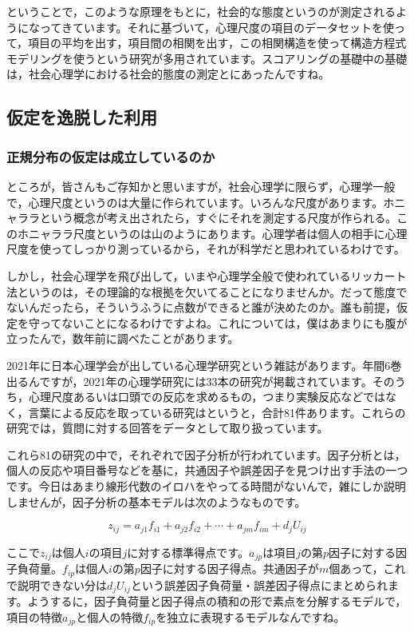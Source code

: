 \documentclass{ltjsbook}
\begin{document}
ということで，このような原理をもとに，社会的な態度というのが測定されるようになってきています。それに基づいて，心理尺度の項目のデータセットを使って，項目の平均を出す，項目間の相関を出す，この相関構造を使って構造方程式モデリングを使うという研究が多用されています。スコアリングの基礎中の基礎は，社会心理学における社会的態度の測定とにあったんですね。

\subsection{仮定を逸脱した利用}

\subsubsection{正規分布の仮定は成立しているのか}
ところが，皆さんもご存知かと思いますが，社会心理学に限らず，心理学一般で，心理尺度というのは大量に作られています。いろんな尺度があります。ホニャララという概念が考え出されたら，すぐにそれを測定する尺度が作られる。このホニャララ尺度というのは山のようにあります。心理学者は個人の相手に心理尺度を使ってしっかり測っているから，それが科学だと思われているわけです。

しかし，社会心理学を飛び出して，いまや心理学全般で使われているリッカート法というのは，その理論的な根拠を欠いてることになりませんか。だって態度でないんだったら，そういうふうに点数ができると誰が決めたのか。誰も前提，仮定を守ってないことになるわけですよね。これについては，僕はあまりにも腹が立ったんで，数年前に調べたことがあります。

2021年に日本心理学会が出している心理学研究という雑誌があります。年間6巻出るんですが，2021年の心理学研究には33本の研究が掲載されています。そのうち，心理尺度あるいは口頭での反応を求めるもの，つまり実験反応などではなく，言葉による反応を取っている研究はというと，合計81件あります。これらの研究では，質問に対する回答をデータとして取り扱っています。

これら81の研究の中で，それぞれで因子分析が行われています。因子分析とは，個人の反応や項目番号などを基に，共通因子や誤差因子を見つけ出す手法の一つです。今日はあまり線形代数のイロハをやってる時間がないんで，雑にしか説明しませんが，因子分析の基本モデルは次のようなものです。

\[ z_{ij} = a_{j1}f_{i1}+a_{j2}f_{i2}+\cdots+a_{jm}f_{im}+d_jU_{ij} \]

ここで$z_{ij}$は個人$i$の項目$j$に対する標準得点です。$a_{jp}$は項目$j$の第$p$因子に対する因子負荷量。$f_{ip}$は個人$i$の第$p$因子に対する因子得点。共通因子が$m$個あって，これで説明できない分は$d_jU_{ij}$という誤差因子負荷量・誤差因子得点にまとめられます。ようするに，因子負荷量と因子得点の積和の形で素点を分解するモデルで，項目の特徴$a_{jp}$と個人の特徴$f_{ip}$を独立に表現するモデルなんですね。
\end{document}
